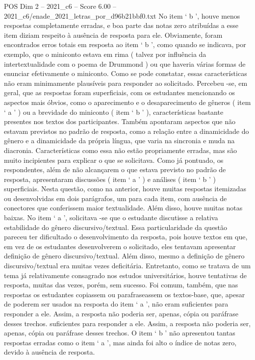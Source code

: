 \begin{textsample}{POS Dim 2 – 2021\_c6 – Score 6.00 – 2021\_c6/enade\_2021\_letras\_por\_d96b21bbf0.txt}
No item ‘ b ’, houve menos respostas completamente erradas, e boa parte das notas zero atribuídas a esse item diziam respeito à ausência de resposta para ele.
Obviamente, foram encontrados erros totais em resposta ao item ‘ b ’, como quando se indicava, por exemplo, que o miniconto estava em rima ( talvez por influência da intertextualidade com o poema de Drummond ) ou que haveria várias formas de enunciar efetivamente o miniconto.
Como se pode constatar, essas características não eram minimamente plausíveis para responder ao solicitado.
Percebeu -se, em geral, que as respostas foram superficiais, com os estudantes mencionando os aspectos mais óbvios, como o aparecimento e o desaparecimento de gêneros ( item ‘ a ’ ) ou a brevidade do miniconto ( item ‘ b ’ ), características bastante presentes nos textos dos participantes.
Também apontaram aspectos que não estavam previstos no padrão de resposta, como a relação entre a dinamicidade do gênero e a dinamicidade da própria língua, que varia na sincronia e muda na diacronia.
Características como essa não estão propriamente erradas, mas são muito incipientes para explicar o que se solicitava.
Como já pontuado, os respondentes, além de não alcançarem o que estava previsto no padrão de resposta, apresentaram discussões ( item ‘ a ’ ) e análises ( item ‘ b ’ ) superficiais.
Nesta questão, como na anterior, houve muitas respostas itemizadas ou desenvolvidas em dois parágrafos, um para cada item, com ausência de conectores que conferissem maior textualidade.
Além disso, houve muitas notas baixas.
No item ‘ a ’, solicitava -se que o estudante discutisse a relativa estabilidade do gênero discursivo/textual.
Essa particularidade da questão pareceu ter dificultado o desenvolvimento da resposta, pois houve textos em que, em vez de os estudantes desenvolverem o solicitado, eles tentavam apresentar definição de gênero discursivo/textual.
Além disso, mesmo a definição de gênero discursivo/textual era muitas vezes deficitária.
Entretanto, como se tratava de um tema já relativamente consagrado nos estudos universitários, houve tentativas de resposta, muitas das vezes, porém, sem sucesso.
Foi comum, também, que nas respostas os estudantes copiassem ou parafraseassem os textos-base, que, apesar de poderem ser usados na resposta do item ‘ a ’, não eram suficientes para responder a ele.
Assim, a resposta não poderia ser, apenas, cópia ou paráfrase desses trechos. suficientes para responder a ele.
Assim, a resposta não poderia ser, apenas, cópia ou paráfrase desses trechos.
O item ‘ b ’ não apresentou tantas respostas erradas como o item ‘ a ’, mas ainda foi alto o índice de notas zero, devido à ausência de resposta.

\end{textsample}
